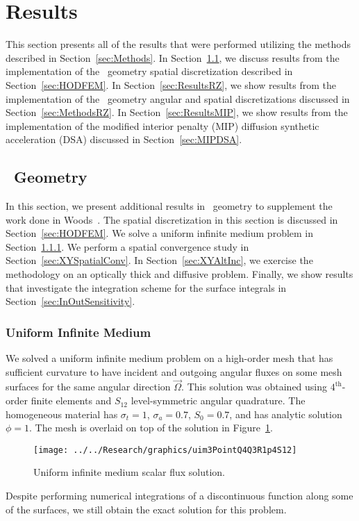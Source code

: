 \documentclass[12pt,letterpaper]{article}
\begin{document}
\section{Results}
\label{sec:Results}
This section presents all of the results that were performed utilizing the methods described in Section~\ref{sec:Methods}. In Section~\ref{sec:ResultsXY}, we discuss results from the implementation of the \XY\ geometry spatial discretization described in Section~\ref{sec:HODFEM}. In Section~\ref{sec:ResultsRZ}, we show results from the implementation of the \RZ\ geometry angular and spatial discretizations discussed in Section~\ref{sec:MethodsRZ}. In Section~\ref{sec:ResultsMIP}, we show results from the implementation of the modified interior penalty (MIP) diffusion synthetic acceleration (DSA) discussed in Section~\ref{sec:MIPDSA}.

\subsection{\XY\ Geometry}
\label{sec:ResultsXY}
In this section, we present additional results in \XY\ geometry to supplement the work done in Woods~\cite{WoodsThesis}. The spatial discretization in this section is discussed in Section~\ref{sec:HODFEM}. We solve a uniform infinite medium problem in Section~\ref{sec:XYuim}. We perform a spatial convergence study in Section~\ref{sec:XYSpatialConv}. In Section~\ref{sec:XYAltInc}, we exercise the methodology on an optically thick and diffusive problem. Finally, we show results that investigate the integration scheme for the surface integrals in Section~\ref{sec:InOutSensitivity}.

\subsubsection{Uniform Infinite Medium}
\label{sec:XYuim}
We solved a uniform infinite medium problem on a high-order mesh that has sufficient curvature to have incident and outgoing angular fluxes on some mesh surfaces for the same angular direction $\vec{\Omega}$. This solution was obtained using $4^\text{th}$-order finite elements and $S_{12}$ level-symmetric angular quadrature. The homogeneous material has $\sigma_t=1$, $\sigma_a=0.7$, $S_0=0.7$, and has analytic solution $\phi=1$. The mesh is overlaid on top of the solution in Figure~\ref{fig:uim3PointQ4Q3R1p4S12}.
%
\begin{figure}[!htb]
\centering
\texttt{[image: ../../Research/graphics/uim3PointQ4Q3R1p4S12]}
\caption{Uniform infinite medium scalar flux solution.}
\label{fig:uim3PointQ4Q3R1p4S12}
\end{figure}
%
Despite performing numerical integrations of a discontinuous function along some of the surfaces, we still obtain the exact solution for this problem.
\end{document}

